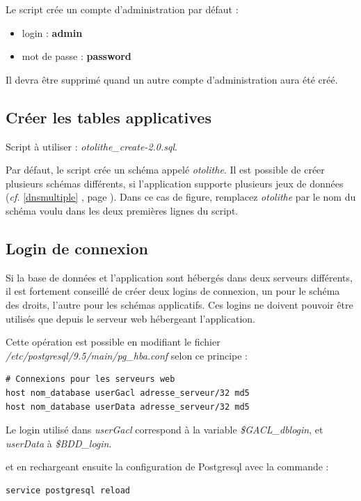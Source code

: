Le script crée un compte d'administration par défaut :
\begin{itemize}
\item login : \textbf{admin}
\item mot de passe : \textbf{password}
\end{itemize}

Il devra être supprimé quand un autre compte d'administration aura été créé.


\subsection{Créer les tables applicatives}
Script à utiliser : \textit{otolithe\_create-2.0.sql}.

Par défaut, le script crée un schéma appelé \textit{otolithe}. Il est possible de créer plusieurs schémas différents, si l'application supporte plusieurs jeux de données (\textit{cf.} \ref{dnsmultiple} \textit{}, page \pageref{dnsmultiple}). Dans ce cas de figure, remplacez \textit{otolithe} par le nom du schéma voulu dans les deux premières lignes du script.

\subsection{Login de connexion}

Si la base de données et l'application sont hébergés dans deux serveurs différents, il est fortement conseillé de créer deux logins de connexion, un pour le schéma des droits, l'autre pour les schémas applicatifs. Ces logins ne doivent pouvoir être utilisés que depuis le serveur web hébergeant l'application.

Cette opération est possible en modifiant le fichier \textit{/etc/postgresql/9.5/main/pg\_hba.conf} selon ce principe :

\begin{lstlisting}
# Connexions pour les serveurs web 
host nom_database userGacl adresse_serveur/32 md5 
host nom_database userData adresse_serveur/32 md5
\end{lstlisting}

Le login utilisé dans \textit{userGacl} correspond à la variable \textit{\$GACL\_dblogin}, et \textit{userData} à \textit{\$BDD\_login}.

et en rechargeant ensuite la configuration de Postgresql avec la commande :
\begin{lstlisting}
service postgresql reload
\end{lstlisting}

